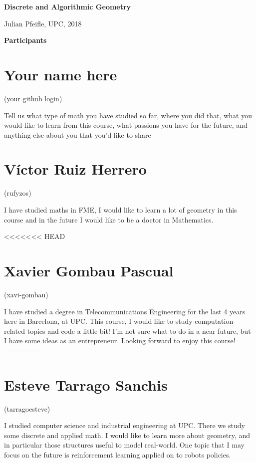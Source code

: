 \documentclass[11pt]{amsart}
\begin{document}
\begin{center}
\textbf{\sffamily
   Discrete and Algorithmic Geometry }

\medskip
   Julian Pfeifle,
   UPC, 2018
\end{center}

\bigskip

\begin{center}
  \textbf{\sffamily Participants}
\end{center}

\medskip

\section*{Your name here}
(your github login)

Tell us what type of math you have studied so far, where you did that, what you would like to learn from this course, what passions you have for the future, and anything else about you that you'd like to share

\medskip

\section*{Víctor Ruiz Herrero}
(rufyzos)

I  have  studied  maths  in  FME,  I  would  like  to  learn  a  lot  of  geometry  in  this course and in the future I would like to be a doctor in Mathematics.

\medskip

<<<<<<< HEAD
\section*{Xavier Gombau Pascual}
(xavi-gombau)

I have studied a degree in Telecommunications Engineering for the last 4 years here in Barcelona, at UPC. This course, I would like to study computation-related topics and code a little bit! I'm not sure what to do in a near future, but I have some ideas as an entrepreneur. Looking forward to enjoy this course! 
=======
\section*{Esteve Tarrago Sanchis}
(tarragoesteve)

I  studied computer science and industrial engineering at UPC. There we study some discrete and applied math. I would like to learn more about geometry, and in particular those structures useful to model real-world. One topic that I may focus on the future is reinforcement learning applied on to robots policies. 
\end{document}
